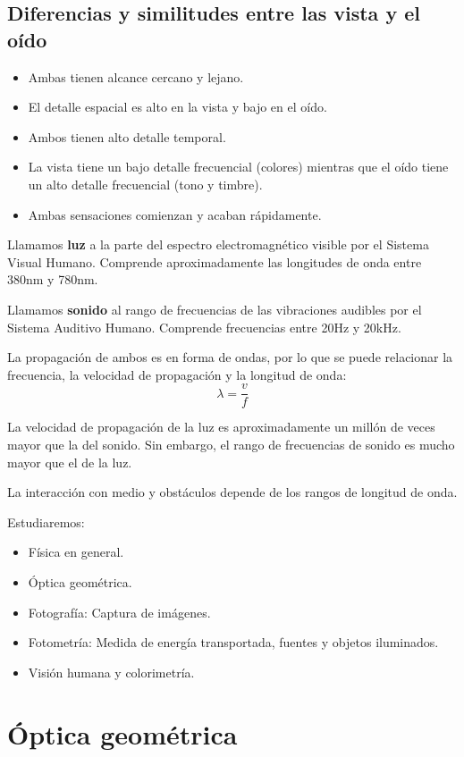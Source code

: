 \documentclass[a4paper]{book}
\begin{document}
\subsection{Diferencias y similitudes entre las vista y el oído}
\begin{itemize}
	\item Ambas tienen alcance cercano y lejano.
	\item El detalle espacial es alto en la vista y bajo en el oído.
	\item Ambos tienen alto detalle temporal.
	\item La vista tiene un bajo detalle frecuencial (colores) mientras que el oído tiene un alto detalle frecuencial (tono y timbre).
	\item Ambas sensaciones comienzan y acaban rápidamente.
\end{itemize}

Llamamos \textbf{luz} a la parte del espectro electromagnético visible por el Sistema Visual Humano. Comprende aproximadamente las longitudes de onda entre 380nm y 780nm.

Llamamos \textbf{sonido} al rango de frecuencias de las vibraciones audibles por el Sistema Auditivo Humano. Comprende frecuencias entre 20Hz y 20kHz.

La propagación de ambos es en forma de ondas, por lo que se puede relacionar la frecuencia, la velocidad de propagación y la longitud de onda:
\[ \lambda = \frac{v}{f}  \]

La velocidad de propagación de la luz es aproximadamente un millón de veces mayor que la del sonido. Sin embargo, el rango de frecuencias de sonido es mucho mayor que el de la luz.

La interacción con medio y obstáculos depende de los rangos de longitud de onda.

Estudiaremos:
\begin{itemize}
	\item Física en general.
	\item Óptica geométrica.
	\item Fotografía: Captura de imágenes.
	\item Fotometría: Medida de energía transportada, fuentes y objetos iluminados.
	\item Visión humana y colorimetría.
\end{itemize}

\section{Óptica geométrica}
\end{document}
